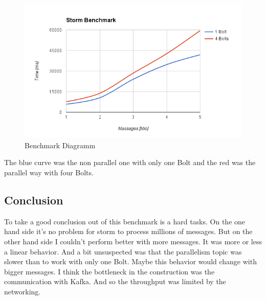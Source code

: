 \newpage

\begin{figure}[H]
\centering
\captionsetup{justification=centering}
\includegraphics[width=1.0\textwidth]{images/benchmark.png}
\caption[Benchmark Diagramm]{Benchmark Diagramm}
\end{figure}

The blue curve was the non parallel one with only one Bolt and
the red was the parallel way with four Bolts.

\subsection{Conclusion}
To take a good conclusion out of this benchmark is a hard tasks.
On the one hand side it's no problem for storm to process millions of messages.
But on the other hand side I couldn't perform better with more messages. It was more or less a linear behavior.
And a bit unsuspected was that the parallelism topic was slower than to work with only one Bolt.
Maybe this behavior would change with bigger messages.
I think the bottleneck in the construction was the communication with Kafka. And so the throughput was limited by the networking.





